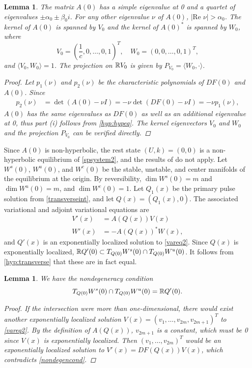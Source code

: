 \documentclass[12pt]{elsarticle}
\theoremstyle{plain}
\newtheorem{lemma}[theorem]{Lemma}
\theoremstyle{definition}
\theoremstyle{remark}
\numberwithin{theorem}{section}
\numberwithin{equation}{section}
\begin{document}
\begin{lemma}\label{eigA0lemma}
The matrix $A(0)$ has a simple eigenvalue at 0 and a quartet of eigenvalues $\pm \alpha_0 \pm \beta_0 i$. For any other eigenvalue $\nu$ of $A(0)$, $|\text{Re }\nu| > \alpha_0$. The kernel of $A(0)$ is spanned by $V_0$ and the kernel of $A(0)^*$ is spanned by $W_0$, where
\begin{equation}\label{V0W0}
V_0 = \left(\frac{1}{c}, 0, \dots, 0, 1\right)^T, \quad
W_0 = (0, 0, \dots, 0, 1)^T,
\end{equation}
and $\langle V_0, W_0 \rangle = 1$. The projection on $\mathbb{R} V_0$ is given by $P_{V_0} = \langle W_0, \cdot \rangle$.
\begin{proof}
Let $p_1(\nu)$ and $p_2(\nu)$ be the characteristic polynomials of $DF(0)$ and $A(0)$. Since
\begin{align*}
p_2(\nu) &= \det(A(0) - \nu I) = -\nu \det(DF(0) - \nu I) = -\nu p_1(\nu),
\end{align*}
$A(0)$ has the same eigenvalues as $DF(0)$ as well as an additional eigenvalue at 0, thus part (i) follows from \cref{hyp:hypeq}. The kernel eigenvectors $V_0$ and $W_0$ and the projection $P_{V_0}$ can be verified directly.
\end{proof}
\end{lemma}

Since $A(0)$ is non-hyperbolic, the rest state $(U, k) = (0, 0)$ is a non-hyperbolic equilibrium of \cref{spsystem2}, and the results of \cite{Sandstede1998} do not apply. Let $W^s(0)$, $W^u(0)$, and $W^c(0)$ be the stable, unstable, and center manifolds of the equilibrium at the origin. By reversibility, $\dim W^s(0) = m$ and $\dim W^u(0) = m$, and $\dim W^c(0) = 1$. Let $Q_1(x)$ be the primary pulse solution from \cref{transverseint}, and let $Q(x) = (Q_1(x), 0)$. The associated variational and adjoint variational equations are
\begin{align}
V'(x) &= A(Q(x)) V(x) \label{vareq2} \\
W'(x) &= -A(Q(x))^* W(x) \label{adjvareq2},
\end{align}
and $Q'(x)$ is an exponentially localized solution to \cref{vareq2}. Since $Q(x)$ is exponentially localized, $\mathbb{R} Q'(0) \subset T_{Q(0)}W^s(0) \cap T_{Q(0)}W^u(0)$. It follows from \cref{hyp:transverse} that these are in fact equal.

\begin{lemma}\label{nondegenlemma}
We have the nondegeneracy condition
\begin{equation}\label{nondegen2}
T_{Q(0)}W^s(0) \cap T_{Q(0)}W^u(0) = \mathbb{R} Q'(0).
\end{equation}
\begin{proof}
If the intersection were more than one-dimensional, there would exist another exponentially localized solution $V(x) = (v_1, \dots, v_{2m}, v_{2m+1})^T$ to \cref{vareq2}. By the definition of $A(Q(x))$, $v_{2m+1}$ is a constant, which must be 0 since $V(x)$ is exponentially localized. Then $(v_1, \dots, v_{2m})^T$ would be an exponentially localized solution to $V'(x) = DF(Q(x)) V(x)$, which contradicts \cref{nondegencond}.
\end{proof}
\end{lemma}
\end{document}
